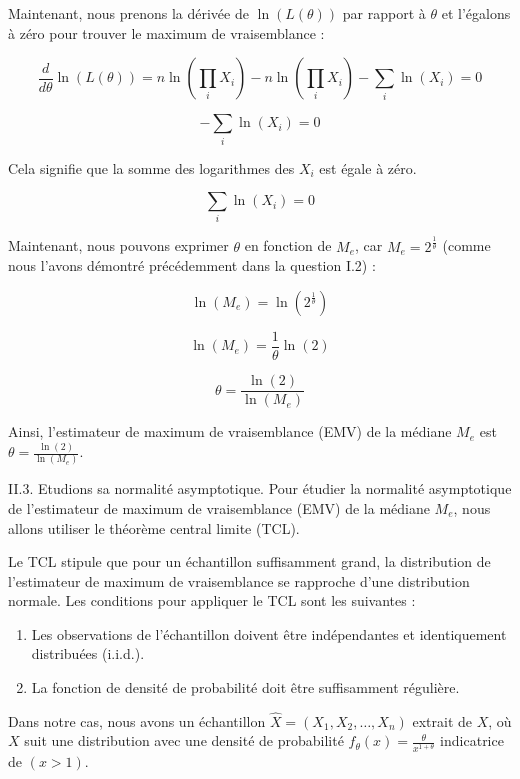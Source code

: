 \documentclass[11pt]{beamer}
\begin{document}
\begin{frame}
Maintenant, nous prenons la dérivée de $\ln(L(\theta))$ par rapport à $\theta$ et l'égalons à zéro pour trouver le maximum de vraisemblance :

\[ \frac{d}{d\theta} \ln(L(\theta)) = n \ln\left(\prod_i X_i\right) - n \ln\left(\prod_i X_i\right) - \sum_i \ln(X_i) = 0 \]

\[ - \sum_i \ln(X_i) = 0 \]

Cela signifie que la somme des logarithmes des $X_i$ est égale à zéro.

\[ \sum_i \ln(X_i) = 0 \]	
\end{frame}
\begin{frame}
	
	Maintenant, nous pouvons exprimer $\theta$ en fonction de $M_e$, car $M_e = 2^{\frac{1}{\theta}}$ (comme nous l'avons démontré précédemment dans la question I.2) :
	
	\[ \ln(M_e) = \ln\left(2^{\frac{1}{\theta}}\right) \]
	
	\[ \ln(M_e) = \frac{1}{\theta} \ln(2) \]
	
	\[ \theta = \frac{\ln(2)}{\ln(M_e)} \]
	
	Ainsi, l'estimateur de maximum de vraisemblance (EMV) de la médiane $M_e$ est $\theta = \frac{\ln(2)}{\ln(M_e)}$.		
\end{frame}
\begin{frame}{II.3. Etudions sa normalité asymptotique.}
	Pour étudier la normalité asymptotique de l'estimateur de maximum de vraisemblance (EMV) de la médiane $M_e$, nous allons utiliser le théorème central limite (TCL).
	
	Le TCL stipule que pour un échantillon suffisamment grand, la distribution de l'estimateur de maximum de vraisemblance se rapproche d'une distribution normale. Les conditions pour appliquer le TCL sont les suivantes :
	
	\begin{enumerate}
		\item Les observations de l'échantillon doivent être indépendantes et identiquement distribuées (i.i.d.).
		\item La fonction de densité de probabilité doit être suffisamment régulière.
	\end{enumerate}
	
	Dans notre cas, nous avons un échantillon $\hat{X} = (X_1, X_2, \ldots, X_n)$ extrait de $X$, où $X$ suit une distribution avec une densité de probabilité $f_\theta(x) = \frac{\theta}{x^{1+\theta}}$ indicatrice de $(x > 1)$.	
\end{frame}
\end{document}
